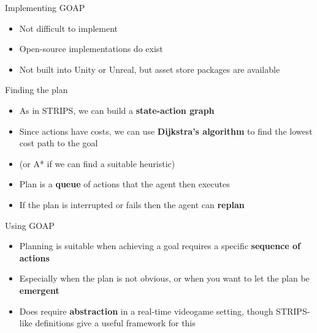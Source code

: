 \begin{frame}{Implementing GOAP}
    \begin{itemize}
        \pause\item Not difficult to implement
        \pause\item Open-source implementations do exist
        \pause\item Not built into Unity or Unreal, but asset store packages are available
    \end{itemize}
\end{frame}

\begin{frame}{Finding the plan}
    \begin{itemize}
        \pause\item As in STRIPS, we can build a \textbf{state-action graph}
        \pause\item Since actions have costs, we can use \textbf{Dijkstra's algorithm} to find the lowest cost path to the goal
        \pause\item (or A* if we can find a suitable heuristic)
        \pause\item Plan is a \textbf{queue} of actions that the agent then executes
        \pause\item If the plan is interrupted or fails then the agent can \textbf{replan}
    \end{itemize}
\end{frame}

\begin{frame}{Using GOAP}
    \begin{itemize}
        \pause\item Planning is suitable when achieving a goal requires a specific \textbf{sequence of actions}
        \pause\item Especially when the plan is not obvious, or when you want to let the plan be \textbf{emergent}
        \pause\item Does require \textbf{abstraction} in a real-time videogame setting, though STRIPS-like definitions give a useful framework for this
    \end{itemize}
\end{frame}

